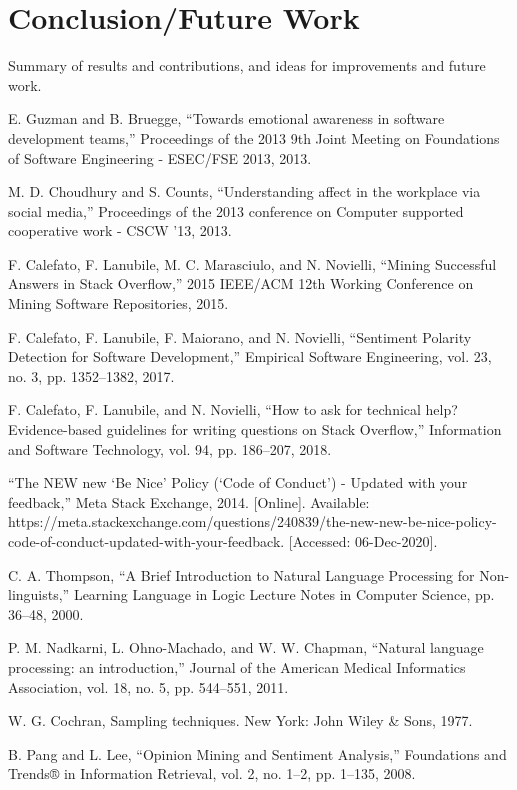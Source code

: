 \documentclass[conference]{IEEEtran}
\begin{document}
\section{Conclusion/Future Work}
Summary of results and contributions, and ideas for improvements and future work.\\

\begin{thebibliography}{00}
 E. Guzman and B. Bruegge, “Towards emotional awareness in software development teams,” Proceedings of the 2013 9th Joint Meeting on Foundations of Software Engineering - ESEC/FSE 2013, 2013. 

 M. D. Choudhury and S. Counts, “Understanding affect in the workplace via social media,” Proceedings of the 2013 conference on Computer supported cooperative work - CSCW '13, 2013. 

 F. Calefato, F. Lanubile, M. C. Marasciulo, and N. Novielli, “Mining Successful Answers in Stack Overflow,” 2015 IEEE/ACM 12th Working Conference on Mining Software Repositories, 2015. 

 F. Calefato, F. Lanubile, F. Maiorano, and N. Novielli, “Sentiment Polarity Detection for Software Development,” Empirical Software Engineering, vol. 23, no. 3, pp. 1352–1382, 2017. 

 F. Calefato, F. Lanubile, and N. Novielli, “How to ask for technical help? Evidence-based guidelines for writing questions on Stack Overflow,” Information and Software Technology, vol. 94, pp. 186–207, 2018. 

 “The NEW new ‘Be Nice’ Policy (‘Code of Conduct’) - Updated with your feedback,” Meta Stack Exchange, 2014. [Online]. Available: https://meta.stackexchange.com/questions/240839/the-new-new-be-nice-policy-code-of-conduct-updated-with-your-feedback. [Accessed: 06-Dec-2020]. 

 C. A. Thompson, “A Brief Introduction to Natural Language Processing for Non-linguists,” Learning Language in Logic Lecture Notes in Computer Science, pp. 36–48, 2000. 

 P. M. Nadkarni, L. Ohno-Machado, and W. W. Chapman, “Natural language processing: an introduction,” Journal of the American Medical Informatics Association, vol. 18, no. 5, pp. 544–551, 2011.

 W. G. Cochran, Sampling techniques. New York: John Wiley \& Sons, 1977. 

 B. Pang and L. Lee, “Opinion Mining and Sentiment Analysis,” Foundations and Trends® in Information Retrieval, vol. 2, no. 1–2, pp. 1–135, 2008. 


\end{thebibliography}
\end{document}
